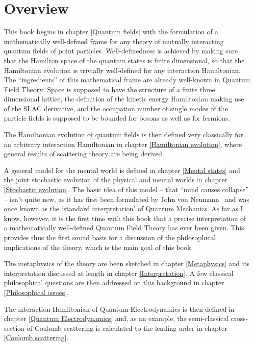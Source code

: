 \documentclass[10pt,a4paper,twoside,openany]{book}
\begin{document}
\section*{Overview}

This book begins in chapter \ref{Quantum fields} with the formulation of a mathematically well-defined frame for any theory of mutually interacting quantum fields of point particles. Well-definedness is achieved by making sure that the Hamilton space of the quantum states is finite dimensional, so that the Hamiltonian evolution is trivially well-defined for any interaction Hamiltonian. The ``ingredients'' of this mathematical frame are already well-known in Quantum Field Theory: Space is supposed to have the structure of a finite three dimensional lattice, the definition of the kinetic energy Hamiltonian making use of the SLAC derivative, and the occupation number of single modes of the particle fields is supposed to be bounded for bosons as well as for fermions.

The Hamiltonian evolution of quantum fields is then defined very classically for an arbitrary interaction Hamiltonian in chapter \ref{Hamiltonian evolution}, where general results of scattering theory are being derived.

A general model for the mental world is defined in chapter \ref{Mental states} and the joint stochastic evolution of the physical and mental worlds in chapter \ref{Stochastic evolution}. The basic idea of this model -- that ``mind causes collapse'' -- isn't quite new, as it has first been formulated by John von Neumann~\cite{Neumann1932} and was once known as the `standard interpretation' of Quantum Mechanics. As far as I know, however, it is the first time with this book that a precise interpretation of a mathematically well-defined Quantum Field Theory has ever been given. This provides thus the first sound basis for a discussion of the philosophical implications of the theory, which is the main goal of this book.

The metaphysics of the theory are been sketched in chapter \ref{Metaphysics} and its interpretation discussed at length in chapter \ref{Interpretation}. A few classical philosophical questions are then addressed on this background in chapter \ref{Philosophical issues}.

The interaction Hamiltonian of Quantum  Electrodynamics is then defined in chapter \ref{Quantum Electrodynamics} and, as an example, the semi-classical cross-section of Coulomb scattering is calculated to the leading order in chapter \ref{Coulomb scattering}.
\end{document}
